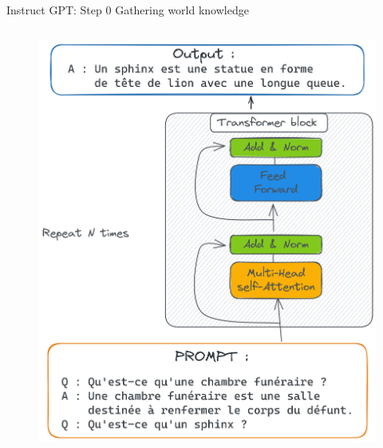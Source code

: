 \documentclass[10pt,aspectratio=169]{beamer}
\begin{document}
\begin{frame}{Instruct GPT: Step 0 Gathering world knowledge}
\begin{columns}
\begin{column}{0.5\textwidth}
\begin{alertblock}{}
                \begin{figure}
                    \centering
                    \includegraphics[width=.7\textwidth]{media/prompt-eg.png}
                \end{figure}
            \end{alertblock}
        \end{column}
    \end{columns}
\end{frame}
\end{document}
